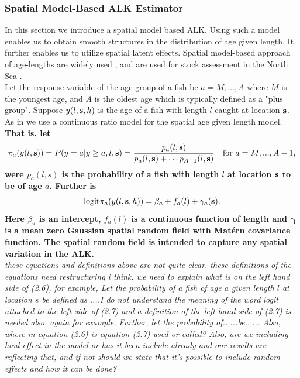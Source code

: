 \documentclass[a4paper 12pt]{article}
\numberwithin{equation}{section}
\begin{document}
\subsubsection{Spatial Model-Based ALK Estimator}
\label{sec:spatialModelALK}
In this section we introduce a spatial model based ALK. Using such a model enables us to obtain smooth structures in the distribution of age given length. It further enables us to utilize spatial latent effects. Spatial model-based approach of age-lengths are widely used \citep{berg2012spatial, hirst2012bayesian, rindorf2001analyses}, and are used for stock assessment in the North Sea \citep{berg2014evaluation}. \\ %
\indent Let the response variable of the age group of a fish be $a = M,...,A$ where $M$ is the youngest age, and $A$ is the oldest age which is typically defined as a "plus group". Suppose $y(l,{\bf s},h)$ is the age  of a fish with length $l$ caught at location ${\bf s}$. As in \citet{berg2012spatial} we use a continuous ratio model for the spatial age given length model. {\bf That is, let
\begin{align}\label{eq:linearPred1}
\pi_a(y(l,{\bf s})) = P(y = a|y \geq a, l, {\bf s}) = \frac{p_a(l,{\bf s})}{p_a(l,{\bf s}) + \cdots p_{A-1}(l,{\bf s})} \vspace{ 4mm} \ \ \ \text{for } a =M,...,A-1 ,
\end{align}
were $p_a(l,s)$ is the probability of a fish with length $l$ at location ${\bf s}$ to be of age $a$. Further is
\begin{align}\label{eq:linearPred}
\text{logit}\pi_a(y(l,{\bf s},h)) = \beta_a +  f_a(l) + \gamma_a({\bf s}).
\end{align}
Here $\beta_a$ is an intercept, $ f_a(l)$ is a continuous function of length and $\pmb{\gamma}$ is a mean zero Gaussian spatial random field with Mat\'{e}rn covariance function. The spatial random field is intended to capture any spatial variation in the ALK.} \\
\emph{these equations and definitions above are not quite clear. these definitions of the equations need restructuring i think. we need to explain what is on the left hand side of (2.6), for example, Let the probability of a fish of age $a$ given length $l$ at location $s$ be defined as ....I do not understand the meaning of the word logit attached to the left side of (2.7) and a definition of the left hand side of (2.7) is needed also, again for example, Further, let the probability of......be...... Also, where in equation (2.6) is equation (2.7) used or called? Also, are we including haul effect in the model or has it been include already and our results are reflecting that, and if not should we state that it's possible to include random effects and how it can be done?}\\
\end{document}
